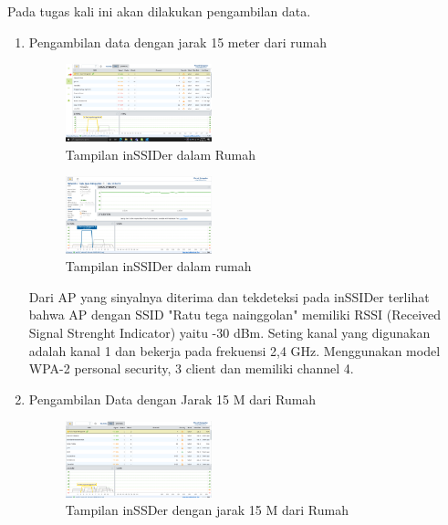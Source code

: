 \documentclass[conference]{IEEEtran}
\begin{document}
Pada tugas kali ini akan dilakukan pengambilan data.
\begin{enumerate}
    \item Pengambilan data dengan jarak 15 meter dari rumah

    \begin{figure}
        \centering
        \includegraphics[width=0.4\textwidth]{8.png}
        \caption{Tampilan inSSIDer dalam Rumah}
    \end{figure}

    \begin{figure}
        \centering
        \includegraphics[width=0.4\textwidth]{9.png}
        \caption{Tampilan inSSIDer dalam rumah}
    \end{figure}

\vspace{0.2cm}

Dari AP yang sinyalnya diterima dan tekdeteksi pada inSSIDer terlihat bahwa AP dengan SSID 
"Ratu tega nainggolan" memiliki RSSI (Received Signal Strenght Indicator) yaitu -30 dBm. 
Seting kanal yang digunakan adalah kanal 1 dan bekerja pada frekuensi 2,4 GHz. 
Menggunakan model WPA-2 personal security, 3 client dan memiliki channel 4.
\vspace{0.2cm}

    \item Pengambilan Data dengan Jarak 15 M dari Rumah

    \begin{figure}
        \centering
        \includegraphics[width=0.4\textwidth]{10.png}
        \caption{Tampilan inSSDer dengan jarak 15 M dari Rumah}
    \end{figure}


\end{enumerate}
\end{document}

